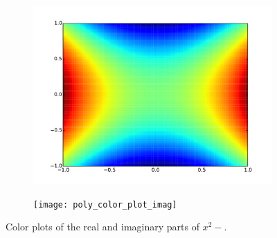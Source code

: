 \begin{figure}
\begin{subfigure}{.49\textwidth}
\includegraphics[width=\textwidth]{poly_color_plot_real}
\end{subfigure}
\begin{subfigure}{.49\textwidth}
\texttt{[image: poly\_color\_plot\_imag]}
\end{subfigure}
\caption{Color plots of the real and imaginary parts of $x^2 - $.}
\label{fig:poly_color_plot}
\end{figure}

